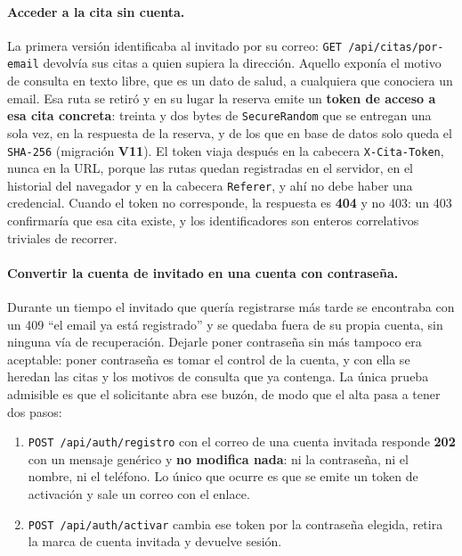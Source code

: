 \documentclass[12pt,a4paper]{report}
\begin{document}
\paragraph{Acceder a la cita sin cuenta.} La primera versión identificaba al invitado por su correo: \texttt{GET /api/citas/por-email} devolvía sus citas a quien supiera la dirección. Aquello exponía el motivo de consulta en texto libre, que es un dato de salud, a cualquiera que conociera un email. Esa ruta se retiró y en su lugar la reserva emite un \textbf{token de acceso a esa cita concreta}: treinta y dos bytes de \texttt{SecureRandom} que se entregan una sola vez, en la respuesta de la reserva, y de los que en base de datos solo queda el \texttt{SHA-256} (migración \textbf{V11}). El token viaja después en la cabecera \texttt{X-Cita-Token}, nunca en la URL, porque las rutas quedan registradas en el servidor, en el historial del navegador y en la cabecera \texttt{Referer}, y ahí no debe haber una credencial. Cuando el token no corresponde, la respuesta es \textbf{404} y no 403: un 403 confirmaría que esa cita existe, y los identificadores son enteros correlativos triviales de recorrer.

\paragraph{Convertir la cuenta de invitado en una cuenta con contraseña.} Durante un tiempo el invitado que quería registrarse más tarde se encontraba con un 409 ``el email ya está registrado'' y se quedaba fuera de su propia cuenta, sin ninguna vía de recuperación. Dejarle poner contraseña sin más tampoco era aceptable: poner contraseña es tomar el control de la cuenta, y con ella se heredan las citas y los motivos de consulta que ya contenga. La única prueba admisible es que el solicitante abra ese buzón, de modo que el alta pasa a tener dos pasos:

\begin{enumerate}
  \item \texttt{POST /api/auth/registro} con el correo de una cuenta invitada responde \textbf{202} con un mensaje genérico y \textbf{no modifica nada}: ni la contraseña, ni el nombre, ni el teléfono. Lo único que ocurre es que se emite un token de activación y sale un correo con el enlace.
  \item \texttt{POST /api/auth/activar} cambia ese token por la contraseña elegida, retira la marca de cuenta invitada y devuelve sesión.
\end{enumerate}
\end{document}
